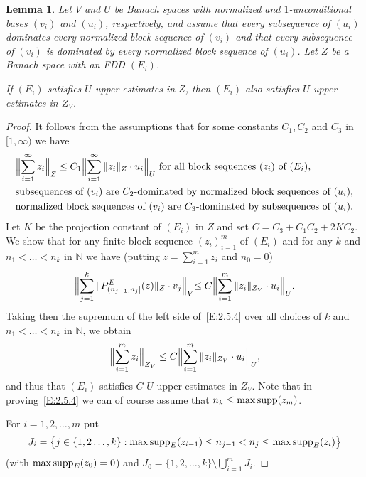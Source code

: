 \documentclass[11pt,leqno]{amsart}
\newtheorem{lem}[thm]{Lemma}
\theoremstyle{definition}
\newcommand{\N}{\mathbb{N}}
\newcommand{\supp}{{\rm supp}}
\begin{document}
\begin{lem}
  \label{L:2.5}
  Let $V$ and $U$ be  Banach spaces with normalized and
  $1$-unconditional bases $(v_i)$ and $(u_i)$, respectively, and
  assume that every subsequence of $(u_i)$ dominates every normalized
  block sequence of $(v_i)$ and that every subsequence of $(v_i)$ is
  dominated by every normalized block sequence of $(u_i)$. Let $Z$ be
  a Banach space with an FDD $(E_i)$.

  If $(E_i)$ satisfies  $U$-upper estimates in $Z$, then $(E_i)$ also
  satisfies $U$-upper estimates in $Z_V$.
\end{lem}
\begin{proof}
  It follows from the assumptions that for some constants $C_1,C_2$
  and $C_3$ in $[1,\infty)$ we have
    \begin{align}
      \label{E:2.5.1}
      &\Bigl\|\sum_{i=1}^\infty z_i\Bigr\|_Z \le C_1
      \Bigl\|\sum_{i=1}^\infty \|z_i\|_Z\cdot u_i \Bigr\|_U \text{ for all
	block sequences $(z_i)$ of $(E_i)$,}\\
      \label{E:2.5.2}
      &\text{subsequences of $(v_i)$ are $C_2$-dominated by normalized
	block sequences of $(u_i)$},\\
      \label{E:2.5.3}
      &\text{normalized block sequences of $(v_i)$ are $C_3$-dominated
	by subsequences of $(u_i)$.}
    \end{align}
    Let $K$ be the projection constant of $(E_i)$ in $Z$ and set
    $C=C_3+C_1C_2+2KC_2$. We  show that for any finite block sequence
    $(z_i)_{i=1}^m$ of $(E_i)$ and for any $k$ and $n_1<\ldots<n_k$
    in $\N$ we have (putting $z=\sum_{i=1}^m z_i$ and $n_0=0$)
    \begin{equation}
      \label{E:2.5.4}
      \Bigl\|\sum_{j=1}^k\|P^E_{(n_{j-1},n_j]}(z)\|_Z\cdot
      v_j\Bigl\|_V\le C\Bigl\|\sum_{i=1}^m\| z_i\|_{Z_V}\cdot
      u_i\Bigl\|_U.
    \end{equation}
    Taking then the supremum of the left side of~\eqref{E:2.5.4} over
    all choices of $k$ and $n_1<\ldots<n_k$ in $\N$, we obtain
    $$\Bigl\|\sum_{i=1}^m  z_i \Bigr\|_{Z_V}\le
    C\Bigl\|\sum_{i=1}^m\| z_i\|_{Z_V}\cdot u_i\Bigl\|_U,$$
    and thus that $(E_i)$ satisfies $C$-$U$-upper estimates in
    $Z_V$. Note that in proving~\eqref{E:2.5.4} we can of course
    assume that $n_k\leq\max\supp(z_m)$.
    
    For $i=1,2,\ldots,m$ put
    $$J_i=\big\{j\in\{1,2\ldots,k\}:\max\supp_E(z_{i-1})\le
    n_{j-1}<n_j\leq \max\supp_E(z_i)\big\}$$
    (with $\max\supp_E(z_0)=0$) and
    $J_0=\{1,2,\ldots,k\}\setminus\bigcup_{i=1}^m J_i$.
    

\end{proof}
\end{document}
